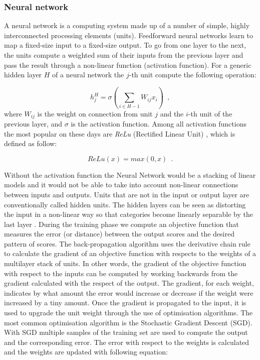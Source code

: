 \subsubsection{Neural network}

A neural network is a computing system made up of a number of simple, highly interconnected processing elements (units). Feedforward neural networks learn to map a fixed-size input to a fixed-size output. To go from one layer to the next, the units compute a weighted sum of their inputs from the previous layer and pass the result through a non-linear function (activation function). For a generic hidden layer $H$ of a neural network the $j$-th unit compute the following operation:  

\begin{equation}
    h_j^H = \sigma(\sum_{i \in H-1}W_{ij}x_i)
    \enspace,
\end{equation}
where $W_{ij}$ is the weight on connection from unit $j$ and the $i$-th unit of the previous layer, and $\sigma$ is the activation function. Among all activation functions the most popular on these days are \textit{ReLu} (Rectified Linear Unit) \citep{Glorot2011DeepSR}, which is defined as follow:

\begin{equation}
    ReLu(x) = max(0,x)
    \enspace.
\end{equation}

Without the activation function the Neural Network would be a stacking of linear models and it would not be able to take into account non-linear connections between inputs and outputs. 
Units that are not in the input or output layer are conventionally called hidden units. The hidden layers can be seen as distorting the input in a non-linear way so that categories become linearly separable by the last layer \citep{DBLP:journals/nature/LeCunBH15}. During the training phase we compute an objective function that measures the error (or distance) between the output scores and the desired pattern of scores. The back-propagation algorithm uses the derivative chain rule to calculate the gradient of an objective function with respects to the weights of a multilayer stack of units. In other words, the gradient of the objective function with respect to the inputs can be computed by working backwards from the gradient calculated with the respect of the output. The gradient, for each weight, indicates by what amount the error would increase or decrease if the weight were increased by a tiny amount. Once the gradient is propagated to the input, it is used to upgrade the unit weight through the use of optimisation algorithms. The most common optimisation algorithm is the Stochastic Gradient Descent (SGD). With SGD multiple samples of the training set are used to compute the output and the corresponding error. The error with respect to the weights is calculated and the weights are updated with following equation:

